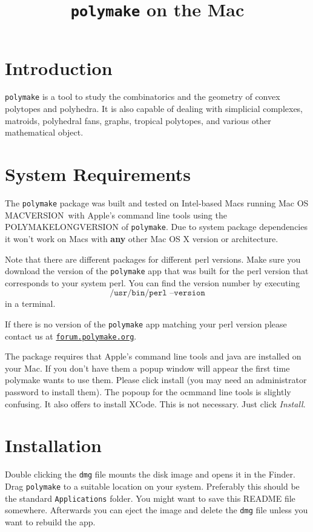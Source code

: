 \documentclass[a4paper]{amsart}
\title{\texttt{polymake} on the Mac\\\polymakeversion}
\newcommand{\macversion}{MACVERSION}
\newcommand{\polymakeversion}{POLYMAKELONGVERSION\xspace}
\newcommand{\polymake}{\texttt{polymake}\xspace}
\begin{document}
\maketitle
\parindent0pt

\section*{Introduction}

\polymake is a tool to study the combinatorics and the geometry of
convex polytopes and polyhedra. It is also capable of dealing with
simplicial complexes, matroids, polyhedral fans, graphs, tropical
polytopes, and various other mathematical object.

\section*{System Requirements}

The \polymake package was built and tested on Intel-based Macs
running Mac OS \macversion\ with Apple's command line tools using the \polymakeversion of
\polymake. Due to system package dependencies it won't work on Macs
with \textbf{any} other Mac OS X version or architecture.

Note that there are different packages for different perl versions. Make sure you download the version of the \polymake app that was built for the perl version that corresponds to your system perl. You can find the version number by executing
\[\texttt{/usr/bin/perl --version}\] in a terminal.

If there is no version of the \polymake app matching your perl version please contact us at \href{http://forum.polymake.org}{\tt forum.polymake.org}.

\bigskip
The package requires that Apple's command line tools and java are installed on your Mac. If you don't have them a popup window will appear the first time polymake wants to use them. Please click install (you may need an administrator password to install them). The popoup for the ocmmand line tools is slightly confusing. It also offers to install XCode. This is not necessary. Just click \emph{Install}.


\section*{Installation}

Double clicking the \texttt{dmg} file mounts the disk image and opens
it in the Finder. Drag \polymake to a suitable location on your
system. Preferably this should be the standard \texttt{Applications}
folder. You might want to save this README file somewhere. Afterwards
you can eject the image and delete the  \texttt{dmg} file unless you
want to rebuild the app.
\end{document}
